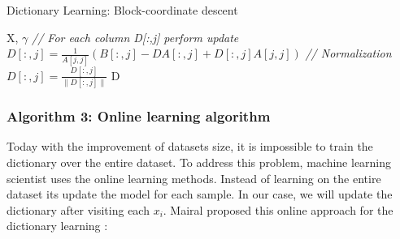 \begin{algorithm}
 \caption{Dictionary Learning: Block-coordinate descent}
 \begin{algorithmic}
    \REQUIRE X, $\gamma$
            \STATE \textit{// For each column D[:,j] perform update}
            \STATE $D[:,j] = \frac{1}{A[j,j]}  (B[:,j] - D  A[:,j] + D[:,j]  A[j,j])$
            \STATE \textit{// Normalization}
            \STATE $D[:,j] = \frac{D[:,j]}{\|D[:,j]\|}$
        \ENDFOR
    \ENDWHILE
    \RETURN D
 \end{algorithmic}

\end{algorithm}

%

\subsubsection{Algorithm 3:  Online learning algorithm}
Today with the improvement of datasets size, it is impossible to train the dictionary over the entire dataset. To address this problem, machine learning scientist uses the online learning methods. Instead of learning on the entire dataset its update the model for each sample. In our case, we will update the dictionary after visiting each $x_i$. Mairal proposed  \cite{Mairal:2009:ODL:1553374.1553463} this online approach for the dictionary learning :

